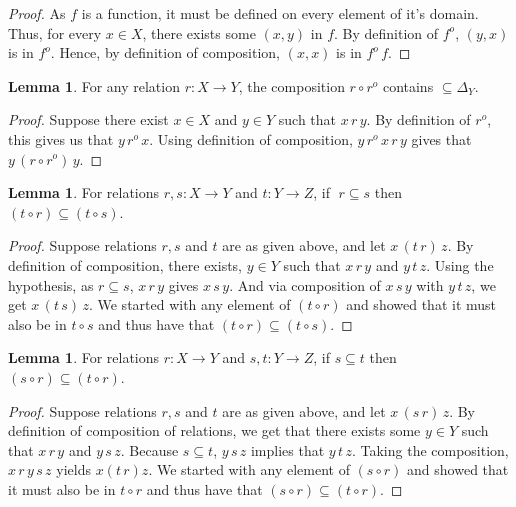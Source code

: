 \documentclass[18pt,a4paper]{article}
\theoremstyle{definition}
\newtheorem{lemma}[theorem]{Lemma}
\begin{document}
\begin{proof}
	As $f$ is a function, it must be defined on every element of it's domain. Thus, for every
	$x \in X$, there exists some $(x,y)$ in $f$. By definition of $f^o$, $(y,x)$ is in $f^o$.
	Hence, by definition of composition, $(x,x)$ is in $f^o \,f$.
\end{proof}
\begin{lemma}
	For any relation $r:X \to Y$, the composition $r\circ r^o$ contains  $\subseteq \Delta_Y$.
\end{lemma}
\begin{proof}
	Suppose there exist $x \in X$ and $y \in Y$ such that
	$x\,r\,y$. By definition of $r^o$, this
	gives us that $y\, r^o \,x$. Using definition of composition,
	$y\, r^o \,x \,r\,y$ gives that	$y\, (r \circ r^o)\, y$.
\end{proof}
\begin{lemma} For relations $r,s:X\to Y$ and $t:Y\to Z$, if $\;r \subseteq s$ then $(t \circ r) \subseteq (t \circ s)$.
\end{lemma}
\begin{proof}
	Suppose relations $r,s$ and $t$ are as given above, and let $x \,(t \, r)\,z$.
	By definition of composition, there
	exists, $y \in Y$ such that $x\,r\,y$ and $y\,t\,z$.
	Using the hypothesis, as $r \subseteq  s $,
	$x\,r\,y$ gives $x\,s\,y$. And via composition of $x\,s\,y$ with $y \, t \, z $, we get
	$x\,(t\,s)\, z$. We started with any element of $(t \circ r)$ and showed that
	it must also be in $t \circ s$ and thus have that $(t \circ r) \subseteq (t \circ s)$.
\end{proof}
\begin{lemma} For relations $r:X\to Y$ and $s,t:Y\to Z$, if $s\subseteq t$ then
	$(s \circ r) \subseteq (t \circ r)$.
\end{lemma}
\begin{proof}
	Suppose relations $r,s$ and $t$ are as given above, and let  $x \,(s \, r)\,z$.
	By definition of composition of relations, we get that there exists
	some $y \in Y$ such that $x\,r\,y$ and $y\,s\,z$. Because $s \subseteq t$, $y\,s\,z$
	implies that $y\,t\,z$. Taking the composition, $x\,r\,y\,s\,z$ yields $x(t\,r)z$.
	We started with any element of $(s \circ r)$ and showed that it must also be in
	$t \circ r$ and thus have that $(s \circ r) \subseteq (t \circ r)$.


\end{proof}
\end{document}
